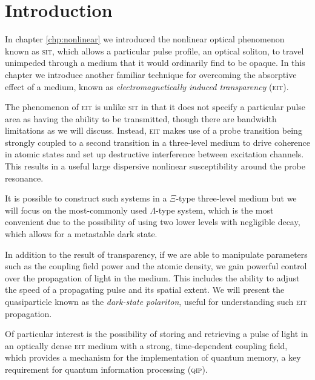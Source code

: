 \section{Introduction}
  \label{sec:polaritons_intro}

  In chapter \ref{chp:nonlinear} we introduced the nonlinear optical phenomenon
  known as \textsc{sit}, which allows a particular pulse profile, an optical
  soliton, to travel unimpeded through a medium that it would ordinarily find to
  be opaque. In this chapter we introduce another familiar technique for
  overcoming the absorptive effect of a medium, known as
  \textit{electromagnetically induced transparency}
  (\textsc{eit}).\cite{Harris1997,Harris1990,Fleischhauer2005,Boller1991}

  The phenomenon of \textsc{eit} is unlike \textsc{sit} in that it does not
  specify a particular pulse area as having the ability to be transmitted,
  though there are bandwidth limitations as we will discuss. Instead,
  \textsc{eit} makes use of a probe transition being strongly coupled to a
  second transition in a three-level medium to drive coherence in atomic states
  and set up destructive interference between excitation channels. This results
  in a useful large dispersive nonlinear susceptibility around the probe
  resonance.

  It is possible to construct such systems in a $\Xi$-type three-level medium
  \cite{Yang2011,Gea-Banacloche1995} but we will focus on the most-commonly used
  $\Lambda$-type system, which is the most convenient due to the possibility of
  using two lower levels with negligible decay, which allows for a metastable
  dark state.\cite{Fleischhauer2005}

  In addition to the result of transparency, if we are able to manipulate
  parameters such as the coupling field power and the atomic density, we gain
  powerful control over the propagation of light in the medium. This includes
  the ability to adjust the speed of a propagating pulse and its spatial extent.
  We will present the quasiparticle known as the \textit{dark-state polariton},
  useful for understanding such \textsc{eit} propagation.\cite{Fleischhauer2000,Fleischhauer2002}

  Of particular interest is the possibility of storing and retrieving a pulse of
  light in an optically dense \textsc{eit} medium with a strong, time-dependent
  coupling field, which provides a mechanism for the implementation of quantum
  memory\cite{Lvovsky2009, Zhao2008}, a key requirement for quantum information
  processing (\textsc{qip}).\cite{nielsen2000quantum}


